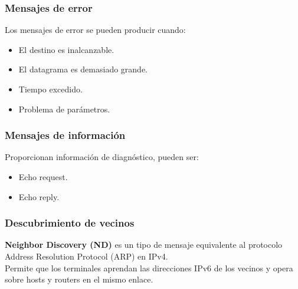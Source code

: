 \subsubsection{Mensajes de error}
Los mensajes de error se pueden producir cuando:
\begin{itemize}
    \item El destino es inalcanzable.
    \item El datagrama es demasiado grande.
    \item Tiempo excedido.
    \item Problema de parámetros.
\end{itemize}
\begin{onepage}
\subsubsection{Mensajes de información}
Proporcionan información de diagnóstico, pueden ser:
\begin{itemize}
    \item Echo request.
    \item Echo reply.
\end{itemize}
\subsubsection{Descubrimiento de vecinos}
\textbf{Neighbor Discovery (ND)} es un tipo de mensaje equivalente al protocolo Address Resolution Protocol (ARP) en IPv4.\\

Permite que los terminales aprendan las direcciones IPv6 de los vecinos y opera sobre hosts y routers en el mismo enlace.\\


\end{onepage}
